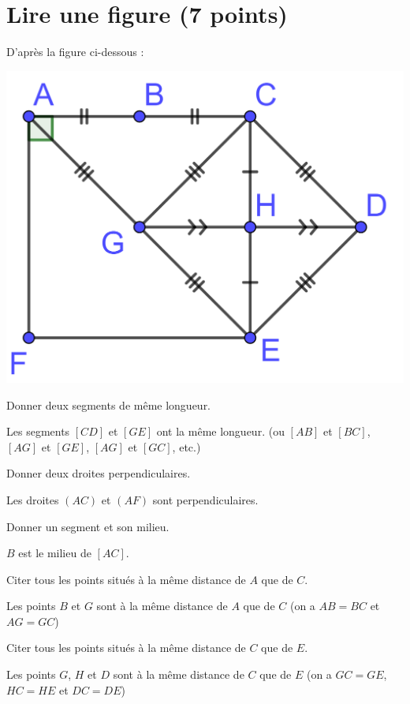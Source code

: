 \section{Lire une figure (7 points)}

D'après la figure ci-dessous :

\begin{center}
	\includegraphics*[scale=0.25]{img/figure}	
\end{center}

\begin{questions}
	\question[1] Donner deux segments de même longueur.
	\begin{solution}
		Les segments $[CD]$ et $[GE]$ ont la même longueur. (ou $[AB]$ et $[BC]$, $[AG]$ et $[GE]$, $[AG]$ et $[GC]$, etc.)
	\end{solution}
	
	\question[1] Donner deux droites perpendiculaires.
	\begin{solution}
		Les droites $(AC)$ et $(AF)$ sont perpendiculaires.
	\end{solution}
	
	\question[1] Donner un segment et son milieu.
	\begin{solution}
		$B$ est le milieu de $[AC]$.
	\end{solution}
	
	\question[2] Citer tous les points situés à la même distance de $A$ que de $C$.
	\begin{solution}
		Les points $B$ et $G$ sont à la même distance de $A$ que de $C$ (on a $AB = BC$ et $AG=GC$)
	\end{solution}
	
	\question[2] Citer tous les points situés à la même distance de $C$ que de $E$.
	\begin{solution}
		Les points $G$, $H$ et $D$ sont à la même distance de $C$ que de $E$ (on a $GC = GE$, $HC=HE$ et $DC=DE$)
	\end{solution}
\end{questions}